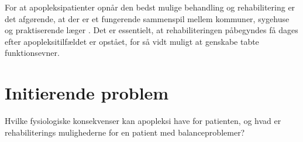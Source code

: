 For at apopleksipatienter opnår den bedst mulige behandling og rehabilitering er det afgørende, at der er et fungerende sammenspil mellem kommuner, sygehuse og praktiserende læger \cite{Sundhedsstyrelsen2010}. Det er essentielt, at rehabiliteringen påbegyndes få dages efter apopleksitilfældet er opstået, for så vidt muligt at genskabe tabte funktionsevner. \cite{Kruuse2015}

\section{Initierende problem}
Hvilke fysiologiske konsekvenser kan apopleksi have for patienten, og hvad er rehabiliterings mulighederne for en patient med balanceproblemer?  